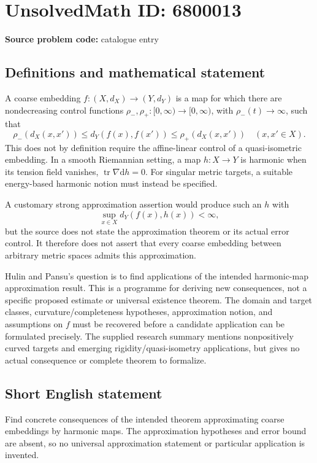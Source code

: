 \documentclass[11pt]{article}
\begin{document}
\section*{UnsolvedMath ID: 6800013}
\textbf{Source problem code:} catalogue entry
\subsection{Definitions and mathematical statement}
A coarse embedding \(f:(X,d_X)\to(Y,d_Y)\) is a map for which there are nondecreasing control functions \(\rho_-,\rho_+:[0,\infty)\to[0,\infty)\), with \(\rho_-(t)\to\infty\), such that
\[
\rho_-(d_X(x,x'))\le d_Y(f(x),f(x'))\le\rho_+(d_X(x,x'))
\quad(x,x'\in X).
\]
This does not by definition require the affine-linear control of a quasi-isometric embedding. In a smooth Riemannian setting, a map \(h:X\to Y\) is harmonic when its tension field vanishes, \(\operatorname{tr}\nabla\mathrm dh=0\). For singular metric targets, a suitable energy-based harmonic notion must instead be specified.

A customary strong approximation assertion would produce such an \(h\) with
\[
\sup_{x\in X}d_Y(f(x),h(x))<\infty,
\]
but the source does not state the approximation theorem or its actual error control. It therefore does not assert that every coarse embedding between arbitrary metric spaces admits this approximation.

Hulin and Pansu's question is to find applications of the intended harmonic-map approximation result. This is a programme for deriving new consequences, not a specific proposed estimate or universal existence theorem. The domain and target classes, curvature/completeness hypotheses, approximation notion, and assumptions on \(f\) must be recovered before a candidate application can be formulated precisely. The supplied research summary mentions nonpositively curved targets and emerging rigidity/quasi-isometry applications, but gives no actual consequence or complete theorem to formalize.
\subsection{Short English statement}
Find concrete consequences of the intended theorem approximating coarse embeddings by harmonic maps. The approximation hypotheses and error bound are absent, so no universal approximation statement or particular application is invented.
\end{document}
